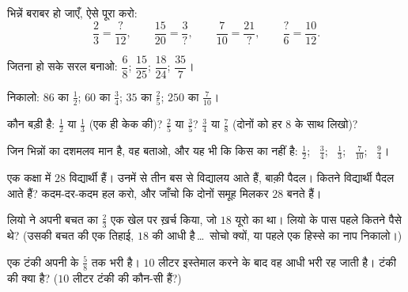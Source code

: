\begin{exercise}[$\star$]\label{exo:g6:fractions:5}
भिन्नें बराबर हो जाएँ, ऐसे पूरा करो:
\[
\frac{2}{3} = \frac{?}{12}, \qquad
\frac{15}{20} = \frac{3}{?}, \qquad
\frac{7}{10} = \frac{21}{?}, \qquad
\frac{?}{6} = \frac{10}{12}.
\]
\end{exercise}

\begin{exercise}[$\star$]\label{exo:g6:fractions:6}
जितना हो सके सरल बनाओ: $\dfrac{6}{8}$; \quad $\dfrac{15}{25}$;
\quad $\dfrac{18}{24}$; \quad $\dfrac{35}{7}$।
\end{exercise}

\begin{exercise}[$\star$]\label{exo:g6:fractions:7}
निकालो: $86$ का $\frac12$; \quad $60$ का $\frac34$; \quad $35$ का
$\frac25$; \quad $250$ का $\frac{7}{10}$।
\end{exercise}

\begin{exercise}[$\star$]\label{exo:g6:fractions:8}
कौन बड़ी है: $\frac12$ या $\frac13$ (एक ही केक की)? $\frac25$
या $\frac35$? $\frac34$ या $\frac78$ (दोनों को हर $8$ के साथ
लिखो)?
\end{exercise}

\begin{exercise}[$\star\star$]\label{exo:g6:fractions:9}
जिन भिन्नों का दशमलव मान है, वह बताओ, और यह भी कि किस  का
नहीं है: $\frac12$; \ $\frac34$; \ $\frac13$; \ $\frac{7}{10}$;
\ $\frac{9}{4}$।
\end{exercise}

\begin{exercise}[$\star\star$]\label{exo:g6:fractions:10}
एक कक्षा में $28$ विद्यार्थी हैं। उनमें से तीन  बस से
विद्यालय आते हैं, बाक़ी पैदल। कितने विद्यार्थी पैदल आते हैं?
कदम-दर-कदम हल करो, और जाँचो कि दोनों समूह मिलकर $28$ बनते हैं।
\end{exercise}

\begin{exercise}[$\star\star$]\label{exo:g6:fractions:11}
लियो ने अपनी बचत का $\frac23$ एक खेल पर ख़र्च किया, जो $18$ यूरो
का था। लियो के पास पहले कितने पैसे थे? (उसकी बचत की एक तिहाई,
$18$ की आधी है\,\dots\ सोचो क्यों, या पहले एक हिस्से का नाप निकालो।)
\end{exercise}

\begin{exercise}[$\star\star\star$]\label{exo:g6:fractions:12}
एक टंकी अपनी  के $\frac58$ तक भरी है। $10$ लीटर इस्तेमाल
करने के बाद वह आधी भरी रह जाती है। टंकी की  क्या है? ($10$
लीटर टंकी की कौन-सी  हैं?)
\end{exercise}

